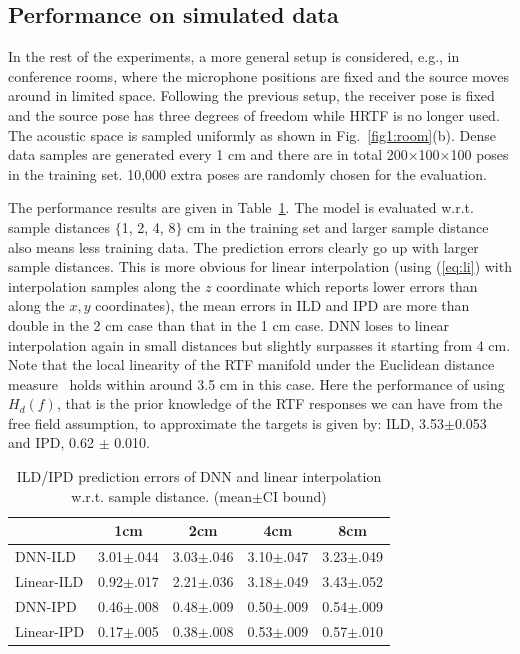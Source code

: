 \documentclass[journal]{IEEEtran}
\begin{document}
\subsection{Performance on simulated data}

In the rest of the experiments, a more general setup is considered, e.g., in conference rooms, where the microphone positions are fixed and the source moves around in limited space. Following the previous setup, the receiver pose is fixed and the source pose has three degrees of freedom while HRTF is no longer used. The acoustic space is sampled uniformly as shown in Fig.~\ref{fig1:room}(b). Dense data samples are generated every 1 cm and there are in total 200$\times$100$\times$100 poses in the training set. 10,000 extra poses are randomly chosen for the evaluation.

The performance results are given in Table~\ref{table:dist}. The model is evaluated w.r.t. sample distances $\{$1, 2, 4, 8$\}$ cm in the training set and larger sample distance also means less training data. The prediction errors clearly go up with larger sample distances. This is more obvious for linear interpolation (using (\ref{eq:li}) with interpolation samples along the $z$ coordinate which reports lower errors than along the $x, y$ coordinates), the mean errors in ILD and IPD are more than double in the 2 cm case than that in the 1 cm case. DNN loses to linear interpolation again in small distances but slightly surpasses it starting from 4 cm. Note that the local linearity of the RTF manifold under the Euclidean distance measure~\cite{laufer2015study} holds within around 3.5 cm in this case. Here the performance of using $H_d(f)$, that is the prior knowledge of the RTF responses we can have from the free field assumption, to approximate the targets is given by: ILD, 3.53$\pm$0.053 and IPD, 0.62 $\pm$ 0.010.

\begin{table}[!h]
\caption{ILD/IPD prediction errors of DNN and linear interpolation w.r.t. sample distance. (mean$\pm$CI bound)}
\label{table:dist}
\begin{center}
\begin{tabular}{|l|c|c|c|c|}
  \hline
               & 1cm           & 2cm           & 4cm           & 8cm   \\ \hline \hline
   DNN-ILD    &3.01$\pm$.044 &3.03$\pm$.046  &3.10$\pm$.047 &3.23$\pm$.049   \\ \hline
   Linear-ILD &0.92$\pm$.017 &2.21$\pm$.036  &3.18$\pm$.049 &3.43$\pm$.052   \\ \hline
   DNN-IPD    &0.46$\pm$.008 &0.48$\pm$.009  &0.50$\pm$.009 &0.54$\pm$.009  \\ \hline
   Linear-IPD &0.17$\pm$.005 &0.38$\pm$.008  &0.53$\pm$.009 &0.57$\pm$.010  \\ \hline
\end{tabular}
\end{center}
\end{table}
\end{document}
